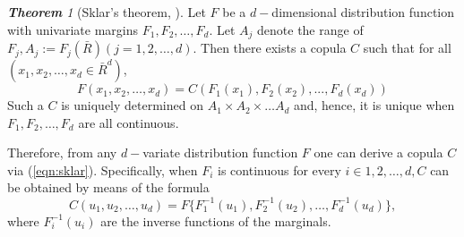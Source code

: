 \documentclass[12pt,oneside,a4paper]{book}
\theoremstyle{definition}
\theoremstyle{remark}
\newtheorem{defn}{\bf Definition}[subsection]
\newtheorem{thm}{\bf Theorem}[subsection]
\begin{document}



				\begin{thm}[Sklar's theorem, \cite{jaworski2010copula}]
					\label{thm:sklar}
					Let $F$ be a $d-$dimensional distribution function with univariate margins $F_1, F_2,\dots, F_d$. Let $A_j$ denote the range of $F_j, A_j := F_j(\bar{R}) (j = 1,2, \dots,d)$. Then there exists a copula $C$ such that for all $(x_1,x_2, \dots,x_d \in \bar{R}^d)$,
						\begin{equation}\label{eqn:sklar}
							F(x_1,x_2, \dots ,x_d) =C(F_1(x_1),F_2(x_2), . . . ,F_d(x_d))
						\end{equation}
					Such a $C$ is uniquely determined on $A_1\times A_2\times \dots A_d$ and, hence, it is unique when $F_1, F_2,\dots, F_d$ are all continuous.
				\end{thm}

				Therefore, from any $d-$variate distribution function $F$ one can derive a copula $C$ via (\ref{eqn:sklar}). Specifically, when $F_i$ is continuous for every $i \in {1,2, \dots ,d}, C$ can be obtained by means of the formula
					\begin{equation}\label{eqn:invcopula}
						C(u_1,u_2, \dots ,u_d) = F\{F^{-1}_1 (u_1),F^{-1}_2 (u_2), \dots,F^{-1}_d (u_d)\},
					\end{equation}
				where $F^{-1}_i \left(u_i\right)$ are the inverse functions of the marginals.
\end{document}
